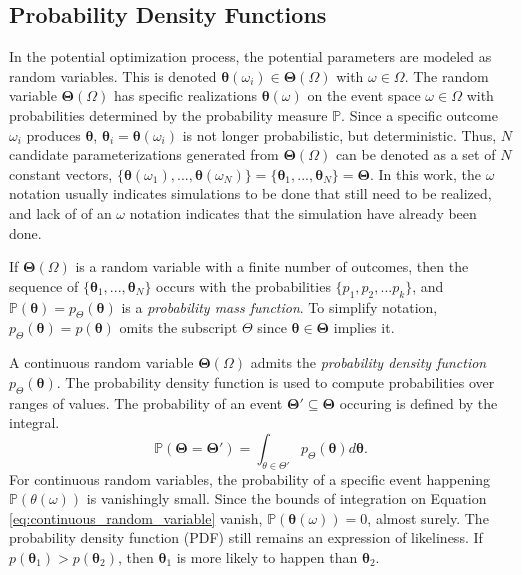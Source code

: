 \subsection{Probability Density Functions}

In the potential optimization process, the potential parameters are modeled as random variables.  This is denoted $\bm{\theta}(\omega_i) \in \bm{\Theta}(\Omega)$ with $\omega \in \Omega$.  The random variable $\bm{\Theta}(\Omega)$ has specific realizations $\bm{\theta}(\omega)$ on the event space $\omega \in \Omega$ with probabilities determined by the probability measure $\mathbb{P}$.
Since a specific outcome $\omega_i$ produces $\bm{\theta}$, $\bm{\theta}_i=\bm{\theta}(\omega_i)$ is not longer probabilistic, but deterministic.  Thus, $N$ candidate parameterizations generated from $\bm{\Theta}(\Omega)$ can be denoted as a set of $N$ constant vectors,
$
 \{\bm{\theta}(\omega_1),...,\bm{\theta}(\omega_N)\}
=\{\bm{\theta}_1,...,\bm{\theta}_N\}
=\bm{\Theta}
$.  In this work, the $\omega$ notation usually indicates simulations to be done that still need to be realized, and lack of of an $\omega$ notation indicates that the simulation have already been done.

If $\bm{\Theta}(\Omega)$ is a random variable with a finite number of outcomes, then the sequence of $\{\bm{\theta}_1,...,\bm{\theta}_N\}$ occurs with the probabilities $\{p_1,p_2,...p_k\}$, and $\mathbb{P}(\bm{\theta})=p_{\Theta}(\bm{\theta})$ is a \emph{probability mass function}.
To simplify notation, $p_\Theta(\bm{\theta})=p(\bm{\theta})$ omits the subscript $\Theta$ since $\bm{\theta}\in\bm{\Theta}$ implies it.

A continuous random variable $\bm{\Theta}(\Omega)$ admits the \emph{probability density function} $p_{\Theta}(\bm{\theta})$. The probability density function is used to compute probabilities over ranges of values. The probability of an event $\bm{\Theta}' \subseteq \bm{\Theta}$ occuring is defined by the integral.
\begin{equation}
	\label{eq:continuous_random_variable}
  \mathbb{P}(\bm{\Theta}=\bm{\Theta}')
	=
	\int_{\theta \in \Theta'} p_{\Theta}(\bm{\theta}) d \bm{\theta}.
\end{equation}
For continuous random variables, the probability of a specific event happening $\mathbb{P}(\theta(\omega))$ is vanishingly small.  Since the bounds of integration on Equation \ref{eq:continuous_random_variable} vanish,  $\mathbb{P}(\bm{\theta}(\omega))=0$, almost surely.  The probability density function (PDF) still remains an expression of likeliness.
If $p(\bm{\theta}_1)>p(\bm{\theta}_2)$, then $\bm{\theta}_1$ is more likely to happen than $\bm{\theta}_2$.

